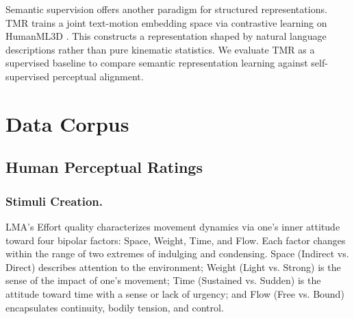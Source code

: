 \documentclass[letterpaper]{article} %
\begin{document}

Semantic supervision offers another paradigm for structured representations. TMR
\citep{petrovich2023tmr} trains a joint text-motion embedding space via contrastive learning on HumanML3D \citep{guo2022humanml3d}. This constructs a representation shaped by natural language descriptions rather than pure kinematic statistics. We evaluate TMR as a supervised baseline to compare semantic representation learning against self-supervised perceptual alignment.


\section{Data Corpus}
\label{sec:data}

\subsection{Human Perceptual Ratings}
\subsubsection{Stimuli Creation.}
LMA's Effort quality characterizes movement dynamics via one’s inner attitude toward four bipolar factors: Space, Weight, Time, and Flow. Each factor changes within the range of two extremes of indulging and condensing. Space (Indirect vs. Direct) describes attention to the environment; Weight (Light vs. Strong) is the sense of the impact of one’s movement; Time (Sustained vs. Sudden) is the attitude toward time with a sense or lack of urgency; and Flow (Free vs. Bound) encapsulates continuity, bodily tension, and control. 
\end{document}
